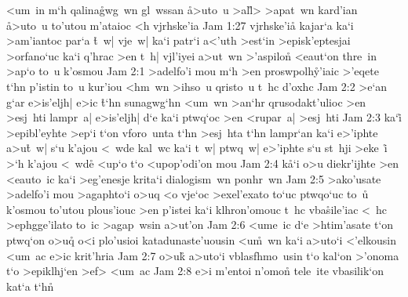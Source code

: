 <um~in
m`h
qalina\r{g}wg~wn
gl~wssan
\r{a}>uto~u
>al\r{l}>
>apat~wn
kard'ian
\r{a}>uto~u
to'utou
m'ataioc
<h
vjrhske'ia\bibvsend
\vs Jam 1:27
vjrhske'i\r{a}
kajar`a
ka`i
>am'iantoc
par`a
\r{t}~w|
vje~w|
ka`i
patr`i
a<'uth
>est`in
>episk'eptesjai
>orfano`uc
ka`i
q'hrac
>en
t~h|
vjl'iyei
a>ut~wn
>'aspilon\r{}
<eaut`on
thre~in
>ap`o
to~u
k'osmou\bibvsend
\vs Jam 2:1
>adelfo'i
mou
m`h
>en
proswpolh\r{y}'iaic
>'eqete
t`hn
p'istin
to~u
kur'iou
<hm~wn
>ihso~u
qristo~u
t~hc
d'oxhc\bibvsend
\vs Jam 2:2
>e`an
g`ar
e>is'eljh|
e>ic
\r{t}`hn
sunagwg`hn
<um~wn
>an`hr
qrusodakt'ulioc
>en
>esj~hti
lampr~a|
e>is'eljh|
d`e
ka`i
ptwq`oc
>en
<rupar~a|
>esj~hti\bibvsend
\vs Jam 2:3
ka`i\r{}
>epibl'eyhte
>ep`i
t`on
vforo~unta
t`hn
>esj~hta
t`hn
lampr`an
ka`i
e>'iphte
a>u\r{t}~w|
s`u
k'ajou
<~wde
kal~wc
ka`i
t~w|
ptwq~w|
e>'iphte
s`u
st~hji
>eke~i\r{}
>`h
k'ajou
<~wd\r{e}
<up`o
t`o
<upop'odi'on
mou\bibvsend
\vs Jam 2:4
k\r{a}`i
o>u
diekr'ijhte
>en
<eauto~ic
ka`i
>eg'enesje
krita`i
dialogism~wn
ponhr~wn\bibvsend
\vs Jam 2:5
>ako'usate
>adelfo'i
mou
>agaphto`i
o>uq
<o
vje`oc
>exel'exato
to`uc
ptwqo`uc
to~u\r{}
k'osmou
to'utou
plous'iouc
>en
p'istei
ka`i
klhron'omouc
t~hc
vba\r{s}ile'iac
<~hc
>ephgge'ilato
to~ic
>agap~wsin
a>ut'on\bibvsend
\vs Jam 2:6
<ume~ic
d`e
>htim'asate
t`on
ptwq`on
o>u\r{q}
o<i
plo'usioi
katadunaste'uousin
<u\r{m}~wn
ka`i
a>uto`i
<'elkousin
<um~ac
e>ic
krit'hria\bibvsend
\vs Jam 2:7
o>u\r{k}
a>uto`i
vblasfhmo~usin
t`o
kal`on
>'onoma
t`o
>epiklhj`en
>ef>
<um~ac\bibvsend
\vs Jam 2:8
e>i
m'entoi
n'omon\r{}
tele~ite
vbasilik`on
kat`a
t`hn\r{}
